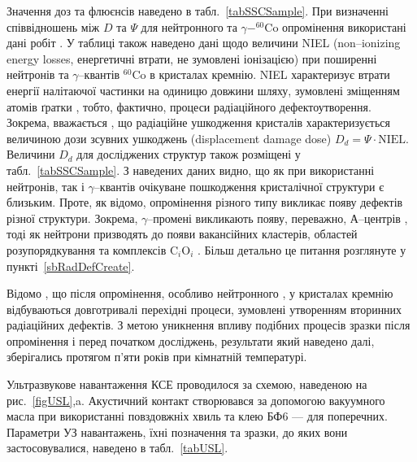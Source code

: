 Значення доз та флюєнсів наведено в табл.~\ref{tabSSCSample}.
При визначенні співвідношень між $D$ та $\Psi$ для нейтронного та $\gamma-^{60}$Co опромінення використані дані робіт \cite{NIEL:Akkerman,Brauning}.
У таблиці також наведено дані щодо величини NIEL (non--ionizing energy losses, енергетичні втрати, не зумовлені іонізацією) при поширенні нейтронів та $\gamma$--квантів $^{60}$Co в кристалах кремнію.
NIEL характеризує втрати енергії налітаючої частинки на одиницю довжини шляху, зумовлені зміщенням атомів ґратки \cite{NIEL:Huhtinen,NIEL:Messenger}, тобто, фактично, процеси радіаційного дефектоутворення.
Зокрема, вважається \cite{NIEL:Messenger}, що радіаційне ушкодження кристалів характеризується величиною дози зсувних ушкоджень (displacement damage dose) $D_d=\Psi\cdot \mbox{NIEL}$.
Величини $D_d$ для досліджених структур також розміщені у табл.~\ref{tabSSCSample}.
З наведених даних видно, що як при використанні нейтронів, так і $\gamma$--квантів очікуване пошкодження кристалічної структури є близьким.
Проте, як відомо,  опромінення різного типу викликає появу дефектів різної структури.
Зокрема, $\gamma$--промені викликають появу, переважно, А--центрів \cite{NIEL:Jafari,Gamma:Prabhakara,NIEL:Moll}, тоді як нейтрони призводять до появи вакансійних кластерів\cite{Rew:Srour,Junkes}, областей розупорядкування  \cite{Neutron:Arutyunov} та комплексів C$_i$O$_i$ \cite{NIEL:Moll,neutron:Londos}.
Більш детально це питання розглянуте у пункті~\ref{sbRadDefCreate}.

Відомо \cite{RadBook}, що після опромінення, особливо нейтронного \cite{NIEL:Moll,Rew:Srour}, у кристалах кремнію відбуваються довготривалі перехідні процеси, зумовлені утворенням вторинних радіаційних дефектів.
З метою уникнення впливу подібних процесів зразки після опромінення і перед початком досліджень, результати який наведено далі, зберігались протягом п'яти років при кімнатній температурі.


Ультразвукове навантаження КСЕ проводилося за схемою, наведеною на рис.~\ref{figUSL},a.
Акустичний контакт створювався за допомогою вакуумного масла при використанні повздовжніх хвиль та клею БФ6 --- для поперечних.
Параметри УЗ навантажень, їхні позначення та зразки, до яких вони застосовувалися, наведено в табл.~\ref{tabUSL}.

